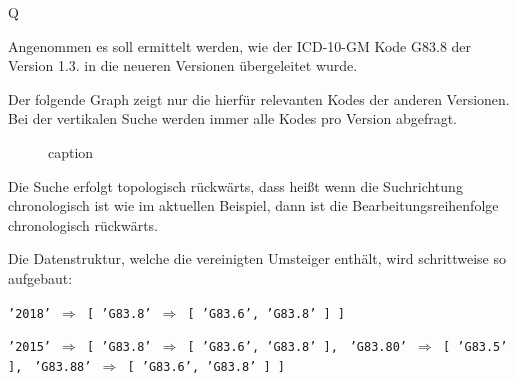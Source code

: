 
Q


Angenommen es soll ermittelt werden, wie der ICD-10-GM Kode G83.8 der Version 1.3. in die neueren Versionen übergeleitet wurde. 

Der folgende Graph zeigt nur die hierfür relevanten Kodes der anderen Versionen. Bei der vertikalen Suche werden immer alle Kodes pro Version abgefragt. 

\begin{figure}[H]
    \centering\Large%
    \resizebox{.99\linewidth}{!}{}
    \normalsize\caption{caption}
    \label{vertical-example}
\end{figure}

Die Suche erfolgt topologisch rückwärts, dass heißt wenn die Suchrichtung chronologisch ist wie im aktuellen Beispiel, dann ist die Bearbeitungsreihenfolge chronologisch rückwärts. 

Die Datenstruktur, welche die vereinigten Umsteiger enthält, wird schrittweise so aufgebaut:

\texttt{'2018' $\Rightarrow$ [ 'G83.8' $\Rightarrow$ [ 'G83.6', 'G83.8' ] ]}

\texttt{'2015' $\Rightarrow$ [ 'G83.8' $\Rightarrow$ [ 'G83.6', 'G83.8' ],} \newline
\texttt{\hphantom{'2015' $\Rightarrow$ [} 'G83.80' $\Rightarrow$ [ 'G83.5' ],} \newline
\texttt{\hphantom{'2015' $\Rightarrow$ [} 'G83.88' $\Rightarrow$ [ 'G83.6', 'G83.8' ] ]}

